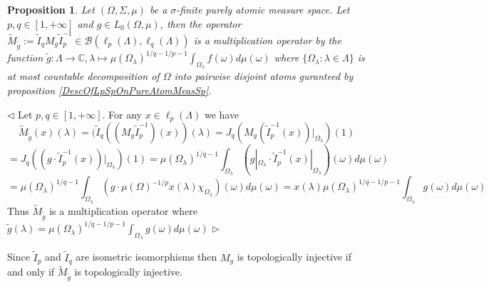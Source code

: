 \documentclass[12pt]{article}
\newtheorem{proposition}[theorem]{Proposition}
\newenvironment{proof}{\par $\triangleleft$}{$\triangleright$}
\begin{document}
\begin{proposition}\label{EquivMultOp} Let $(\Omega,\Sigma,\mu)$ be a $\sigma$-finite purely atomic measure space. Let $p,q\in[1,+\infty]$ and $g\in L_0(\Omega,\mu)$, then the operator $\widetilde{M}_{\widetilde{g}}:=\widetilde{I}_q M_g\widetilde{I}_p^{-1}\in\mathcal{B}(\ell_p(\Lambda),\ell_q(\Lambda))$ is a multiplication operator by the function $\widetilde{g}:\Lambda\to\mathbb{C},\lambda\mapsto \mu(\Omega_\lambda)^{1/q-1/p-1}\int_{\Omega_\lambda}f(\omega)d\mu(\omega)$ where $\{\Omega_\lambda:\lambda\in\Lambda\}$ is at most countable decomposition of $\Omega$ into pairwise disjoint atoms guranteed by proposition \ref{DescOfLpSpOnPureAtomMeasSp}.
\end{proposition}
\begin{proof} Let $p,q\in[1,+\infty]$. For any $x\in\ell_p(\Lambda)$ we have
$$
\widetilde{M}_{\widetilde{g}}(x)(\lambda)
=(\widetilde{I}_q((M_g\widetilde{I}_p^{-1})(x))(\lambda)
=J_q(M_g(\widetilde{I}_p^{-1}(x))|_{\Omega_\lambda})(1)
$$
$$
=J_q((g\cdot\widetilde{I}_p^{-1}(x))|_{\Omega_\lambda})(1)
=\mu(\Omega_\lambda)^{1/q-1}\int_{\Omega_\lambda}(g|_{\Omega_\lambda}\cdot \widetilde{I}_p^{-1}(x)|_{\Omega_\lambda})(\omega)d\mu(\omega)
$$
$$
=\mu(\Omega_\lambda)^{1/q-1}\int_{\Omega_\lambda}(g\cdot \mu(\Omega)^{-1/p}x(\lambda)\chi_{\Omega_{\lambda}})(\omega)d\mu(\omega)
=x(\lambda)\mu(\Omega_\lambda)^{1/q-1/p-1}\int_{\Omega_\lambda} g(\omega)d\mu(\omega)
$$
Thus $\widetilde{M}_{\widetilde{g}}$ is a multiplication operator where $\widetilde{g}(\lambda)=\mu(\Omega_\lambda)^{1/q-1/p-1}\int_{\Omega_\lambda} g(\omega)d\mu(\omega)$
\end{proof}
\newline

Since $\widetilde{I}_p$ and $\widetilde{I}_q$ are isometric isomorphisms then $M_g$ is topologically injective if and only if $\widetilde{M}_{\widetilde{g}}$ is topologically injective.
\end{document}
